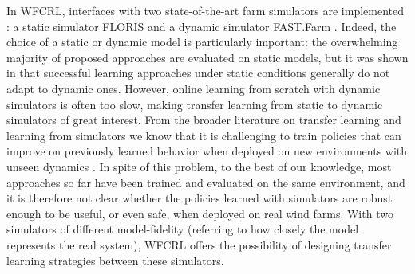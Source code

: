 \documentclass{article}
\newcommand{\jz}[1]{{\color{blue}#1}}
\newcommand{\md}[1]{{\color{red}#1}}
\begin{document}
In WFCRL, interfaces with two state-of-the-art farm simulators are implemented : a static simulator FLORIS \cite{floris} and a dynamic simulator FAST.Farm \cite{fast.farm}. Indeed, the choice of a static or dynamic model is particularly important: the overwhelming majority of proposed approaches are evaluated on static models, but it was shown in \cite{stanfel_2021} that successful learning approaches under static conditions generally do not adapt to dynamic ones.
However, online learning from scratch with dynamic simulators is often too slow, making transfer learning from static to dynamic simulators of great interest.
From the broader literature on transfer learning and learning from simulators we know that it is challenging to train policies that can improve on previously learned behavior when deployed on new environments with unseen dynamics \cite{zhu2023transfer, hofer2021sim2real}. In spite of this problem, to the best of our knowledge, most approaches so far have been trained and evaluated on the same environment, and it is therefore not clear whether the policies learned with simulators are robust enough to be useful, or even safe, when deployed on real wind farms. With two simulators of different model-fidelity (referring to how closely the model represents the real system), WFCRL offers the possibility of designing transfer learning strategies between these simulators.

%
%
%
\end{document}
